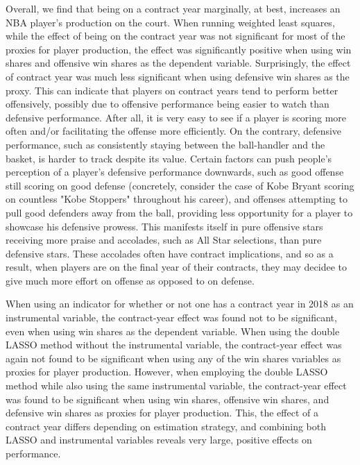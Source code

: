 \documentclass[12pt]{article}
\begin{document}
	Overall, we find that being on a contract year marginally, at best, increases an NBA player's production on the court. When running weighted least squares, while the effect of being on the contract year was not significant for most of the proxies for player production, the effect was significantly positive when using win shares and offensive win shares as the dependent variable. Surprisingly, the effect of contract year was much less significant when using defensive win shares as the proxy. This can indicate that players on contract years tend to perform better offensively, possibly due to offensive performance being easier to watch than defensive performance. After all, it is very easy to see if a player is scoring more often and/or facilitating the offense more efficiently. On the contrary, defensive performance, such as consistently staying between the ball-handler and the basket, is harder to track despite its value. Certain factors can push people's perception of a player's defensive performance downwards, such as good offense still scoring on good defense (concretely, consider the case of Kobe Bryant scoring on countless "Kobe Stoppers" throughout his career), and offenses attempting to pull good defenders away from the ball, providing less opportunity for a player to showcase his defensive prowess. This manifests itself in pure offensive stars receiving more praise and accolades, such as All Star selections, than pure defensive stars. These accolades often have contract implications, and so as a result, when players are on the final year of their contracts, they may decidee to give much more effort on offense as opposed to on defense.
	
	When using an indicator for whether or not one has a contract year in 2018 as an instrumental variable, the contract-year effect was found not to be significant, even when using win shares as the dependent variable. When using the double LASSO method without the instrumental variable, the contract-year effect was again not found to be significant when using any of the win shares variables as proxies for player production. However, when employing the double LASSO method while also using the same instrumental variable, the contract-year effect was found to be significant when using win shares, offensive win shares, and defensive win shares as proxies for player production. This, the effect of a contract year differs depending on estimation strategy, and combining both LASSO and instrumental variables reveals very large, positive effects on performance.
	
\end{document}
